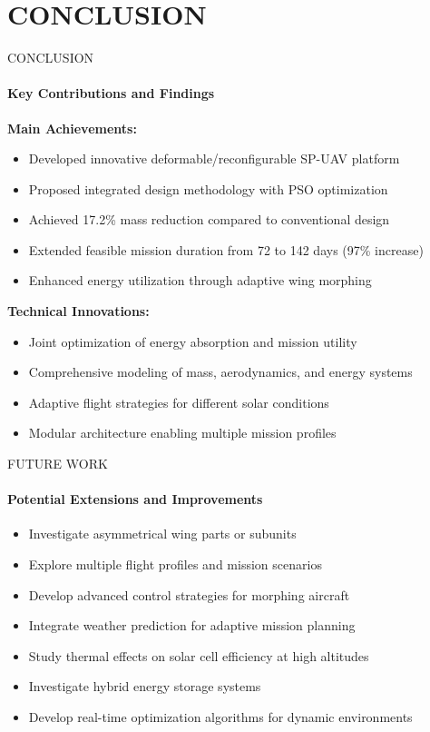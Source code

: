 \documentclass{beamer}
\begin{document}
\section{CONCLUSION}
\begin{frame}{CONCLUSION}
    \framesubtitle{Key Contributions and Findings}
    
    \textbf{Main Achievements:}
    \begin{itemize}
        \item Developed innovative deformable/reconfigurable SP-UAV platform
        \item Proposed integrated design methodology with PSO optimization
        \item Achieved 17.2\% mass reduction compared to conventional design
        \item Extended feasible mission duration from 72 to 142 days (97\% increase)
        \item Enhanced energy utilization through adaptive wing morphing
    \end{itemize}
    
    \textbf{Technical Innovations:}
    \begin{itemize}
        \item Joint optimization of energy absorption and mission utility
        \item Comprehensive modeling of mass, aerodynamics, and energy systems
        \item Adaptive flight strategies for different solar conditions
        \item Modular architecture enabling multiple mission profiles
    \end{itemize}
\end{frame}

\begin{frame}{FUTURE WORK}
    \framesubtitle{Potential Extensions and Improvements}
    
    \begin{itemize}
        \item Investigate asymmetrical wing parts or subunits
        \item Explore multiple flight profiles and mission scenarios
        \item Develop advanced control strategies for morphing aircraft
        \item Integrate weather prediction for adaptive mission planning
        \item Study thermal effects on solar cell efficiency at high altitudes
        \item Investigate hybrid energy storage systems
        \item Develop real-time optimization algorithms for dynamic environments
    \end{itemize}
\end{frame}
\end{document}
